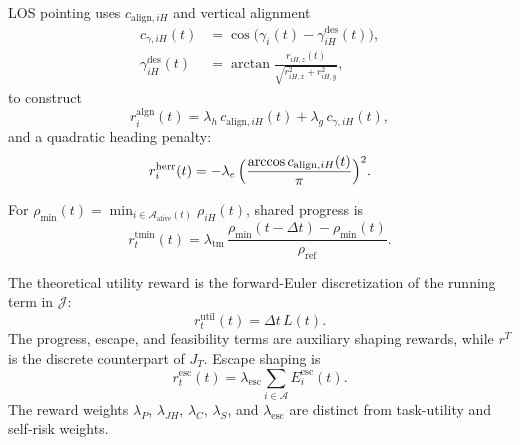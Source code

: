 \documentclass[unbranded]{cja}
\begin{document}
LOS pointing uses $c_{\mathrm{align},iH}$ and vertical alignment
\begin{equation}
\begin{aligned}
c_{\gamma,iH}(t)
&=\cos\!\bigl(\gamma_i(t)-\gamma_{iH}^{\mathrm{des}}(t)\bigr),\\
\gamma_{iH}^{\mathrm{des}}(t)
&=\arctan\!\frac{r_{iH,z}(t)}{\sqrt{r_{iH,x}^{2}+r_{iH,y}^{2}}},
\end{aligned}
\end{equation}
to construct
\begin{equation}
r_i^{\mathrm{algn}}(t)=\lambda_h\,c_{\mathrm{align},iH}(t)+\lambda_g\,c_{\gamma,iH}(t),
\label{eq:r-align}
\end{equation}
and a quadratic heading penalty:
\begin{equation}
r_i^{\mathrm{herr}}(t)=-\lambda_e\,\Bigl(\dfrac{\arccos c_{\mathrm{align},iH}(t)}{\pi}\Bigr)^{2}.
\label{eq:r-herr}
\end{equation}

For $\rho_{\min}(t)=\min_{i\in\mathcal{A}_{\mathrm{alive}}(t)}\rho_{iH}(t)$, shared progress is
\begin{equation}
r_t^{\mathrm{tmin}}(t)=\lambda_{\mathrm{tm}}\,\frac{\rho_{\min}(t-\Delta t)-\rho_{\min}(t)}{\rho_{\mathrm{ref}}}.
\label{eq:r-team}
\end{equation}

The theoretical utility reward is the forward-Euler discretization of the running term in $\mathcal J$:
\begin{equation}
r_t^{\mathrm{util}}(t)
=
\Delta t\,L(t).
\label{eq:r-prior}
\end{equation}
The progress, escape, and feasibility terms are auxiliary shaping rewards, while $r^T$ is the discrete counterpart of $J_T$. Escape shaping is
\begin{equation}
r_t^{\mathrm{esc}}(t)=\lambda_{\mathrm{esc}}\sum_{i\in\mathcal{A}}E_i^{\mathrm{esc}}(t).
\end{equation}
The reward weights $\lambda_P$, $\lambda_{JH}$, $\lambda_C$, $\lambda_S$, and $\lambda_{\mathrm{esc}}$ are distinct from task-utility and self-risk weights.
\end{document}

